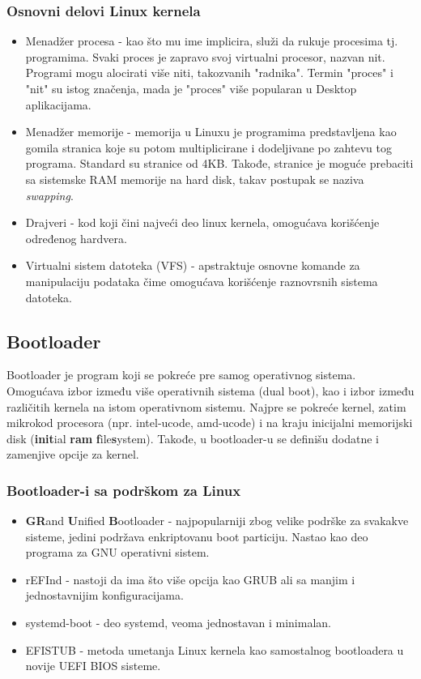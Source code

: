 \documentclass[a4paper,14pt]{article}
\begin{document}
\subsubsection{Osnovni delovi Linux kernela\cite{devibm}}
\begin{itemize}
\item Menadžer procesa - kao što mu ime implicira, služi da rukuje procesima tj. programima. Svaki proces je zapravo svoj virtualni procesor, nazvan nit. Programi mogu alocirati više niti, takozvanih "radnika". Termin "proces" i "nit" su istog značenja, mada je "proces" više popularan u Desktop aplikacijama.
\item Menadžer memorije - memorija u Linuxu je programima predstavljena kao gomila stranica koje su potom multiplicirane i dodeljivane po zahtevu tog programa. Standard su stranice od 4KB. Takođe, stranice je moguće prebaciti sa sistemske RAM memorije na hard disk, takav postupak se naziva \textit{swapping}.
\item Drajveri - kod koji čini najveći deo linux kernela, omogućava korišćenje određenog hardvera.
\item Virtualni sistem datoteka (VFS) - apstraktuje osnovne komande za manipulaciju podataka čime omogućava korišćenje raznovrsnih sistema datoteka.
\end{itemize}
\newpage

\subsection{Bootloader}
Bootloader je program koji se pokreće pre samog operativnog sistema. Omogućava izbor između više operativnih sistema (dual boot), kao i izbor između različitih kernela na istom operativnom sistemu. Najpre se pokreće kernel, zatim mikrokod procesora (npr. intel-ucode, amd-ucode) i na kraju inicijalni memorijski disk (\textbf{init}ial \textbf{ram} \textbf{f}ile\textbf{s}ystem). Takođe, u bootloader-u se definišu dodatne i zamenjive opcije za kernel.
\subsubsection{Bootloader-i sa podrškom za Linux}
\begin{itemize}
\item \textbf{GR}and \textbf{U}nified \textbf{B}ootloader - najpopularniji zbog velike podrške za svakakve sisteme, jedini podržava enkriptovanu boot particiju. Nastao kao deo programa za GNU operativni sistem.
\item rEFInd - nastoji da ima što više opcija kao GRUB ali sa manjim i jednostavnijim konfiguracijama.
\item systemd-boot - deo systemd, veoma jednostavan i minimalan.
\item EFISTUB - metoda umetanja Linux kernela kao samostalnog bootloadera u novije UEFI BIOS sisteme.
\end{itemize}
\end{document}
